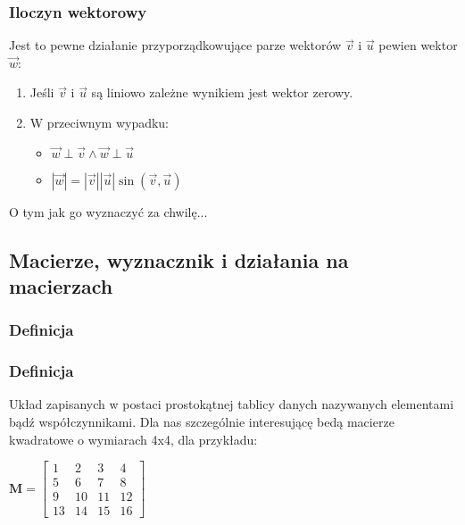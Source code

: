 \documentclass{beamer}
\begin{document}
\begin{frame}
  \frametitle{Iloczyn wektorowy}
  \begin{definition}
    Jest to pewne działanie przyporządkowujące parze wektorów $\overrightarrow{v}$ i $\overrightarrow{u}$ pewien wektor $\overrightarrow{w}$:
    \begin{enumerate}
      \item Jeśli $\overrightarrow{v}$ i $\overrightarrow{u}$ są liniowo zależne wynikiem jest wektor zerowy.
      \item W przeciwnym wypadku:
        \begin{itemize}
          \item $\overrightarrow{w} \perp \overrightarrow{v} \wedge \overrightarrow{w} \perp \overrightarrow{u}$
          \item $ |\overrightarrow{w}| = |\overrightarrow{v}||\overrightarrow{u}|\sin(\overrightarrow{v}, \overrightarrow{u}) $
        \end{itemize}
    \end{enumerate}
  \end{definition}

  O tym jak go wyznaczyć za chwilę...
\end{frame}

\subsection{Macierze, wyznacznik i działania na macierzach}
\subsubsection{Definicja}

\begin{frame}
  \frametitle{Definicja}
  \begin{definition}[Macierz]
    Układ zapisanych w postaci prostokątnej tablicy danych nazywanych elementami bądź współczynnikami. Dla nas szczególnie interesującę bedą macierze kwadratowe o wymiarach 4x4, dla przykładu: \\
     \begin{center}
    \begin{math}
      \textbf{M} =
      \begin{bmatrix}
        1  & 2  & 3  & 4 \\
        5  & 6  & 7  & 8 \\
        9  & 10 & 11 & 12 \\
        13 & 14 & 15 & 16
      \end{bmatrix}
    \end{math}
  \end{center}
  \end{definition}
\end{frame}
\end{document}
